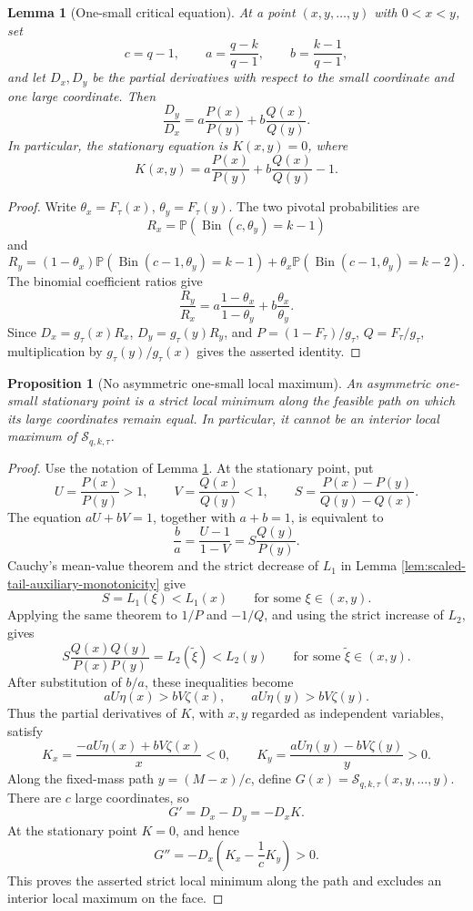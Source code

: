 \documentclass[11pt]{article}
\newtheorem{lemma}[theorem]{Lemma}
\newtheorem{proposition}[theorem]{Proposition}
\theoremstyle{definition}
\theoremstyle{remark}
\DeclareMathOperator{\Bin}{Bin}
\newcommand{\Pbb}{\mathbb P}
\newcommand{\1}{\mathbf 1}
\begin{document}
\begin{lemma}[One-small critical equation]
\label{lem:one-small-critical-equation}
At a point \((x,y,\ldots,y)\) with \(0<x<y\), set
\[
  c=q-1,\qquad
  a=\frac{q-k}{q-1},\qquad
  b=\frac{k-1}{q-1},
\]
and let \(D_x,D_y\) be the partial derivatives with respect to the small coordinate and one large coordinate.  Then
\[
  \frac{D_y}{D_x}
  =a\frac{P(x)}{P(y)}+b\frac{Q(x)}{Q(y)}.
\]
In particular, the stationary equation is \(K(x,y)=0\), where
\[
  K(x,y)=a\frac{P(x)}{P(y)}+b\frac{Q(x)}{Q(y)}-1.
\]
\end{lemma}

\begin{proof}
Write \(\theta_x=F_\tau(x)\), \(\theta_y=F_\tau(y)\).  The two pivotal probabilities are
\[
  R_x=\Pbb(\Bin(c,\theta_y)=k-1)
\]
and
\[
  R_y=(1-\theta_x)\Pbb(\Bin(c-1,\theta_y)=k-1)
      +\theta_x\Pbb(\Bin(c-1,\theta_y)=k-2).
\]
The binomial coefficient ratios give
\[
  \frac{R_y}{R_x}
  =a\frac{1-\theta_x}{1-\theta_y}
    +b\frac{\theta_x}{\theta_y}.
\]
Since \(D_x=g_\tau(x)R_x\), \(D_y=g_\tau(y)R_y\), and
\(P=(1-F_\tau)/g_\tau\), \(Q=F_\tau/g_\tau\), multiplication by \(g_\tau(y)/g_\tau(x)\) gives the asserted identity.
\end{proof}

\begin{proposition}[No asymmetric one-small local maximum]
\label{prop:no-one-small-local-max}
An asymmetric one-small stationary point is a strict local minimum along the feasible path on which its large coordinates remain equal.  In particular, it cannot be an interior local maximum of \(\mathcal S_{q,k,\tau}\).
\end{proposition}

\begin{proof}
Use the notation of Lemma \ref{lem:one-small-critical-equation}.  At the stationary point, put
\[
  U=\frac{P(x)}{P(y)}>1,
  \qquad
  V=\frac{Q(x)}{Q(y)}<1,
  \qquad
  S=\frac{P(x)-P(y)}{Q(y)-Q(x)}.
\]
The equation \(aU+bV=1\), together with \(a+b=1\), is equivalent to
\[
  \frac ba=\frac{U-1}{1-V}
          =S\frac{Q(y)}{P(y)}.
\]
Cauchy's mean-value theorem and the strict decrease of \(L_1\) in Lemma \ref{lem:scaled-tail-auxiliary-monotonicity} give
\[
  S=L_1(\xi)<L_1(x)
  \qquad\text{for some }\xi\in(x,y).
\]
Applying the same theorem to \(1/P\) and \(-1/Q\), and using the strict increase of \(L_2\), gives
\[
  S\frac{Q(x)Q(y)}{P(x)P(y)}
  =L_2(\widetilde\xi)<L_2(y)
  \qquad\text{for some }\widetilde\xi\in(x,y).
\]
After substitution of \(b/a\), these inequalities become
\[
  aU\eta(x)>bV\zeta(x),
  \qquad
  aU\eta(y)>bV\zeta(y).
\]
Thus the partial derivatives of \(K\), with \(x,y\) regarded as independent variables, satisfy
\[
  K_x=\frac{-aU\eta(x)+bV\zeta(x)}x<0,
  \qquad
  K_y=\frac{aU\eta(y)-bV\zeta(y)}y>0.
\]
Along the fixed-mass path \(y=(M-x)/c\), define
\(G(x)=\mathcal S_{q,k,\tau}(x,y,\ldots,y)\).  There are \(c\) large coordinates, so
\[
  G'=D_x-D_y=-D_xK.
\]
At the stationary point \(K=0\), and hence
\[
  G''=-D_x\left(K_x-\frac1cK_y\right)>0.
\]
This proves the asserted strict local minimum along the path and excludes an interior local maximum on the face.
\end{proof}
\end{document}
